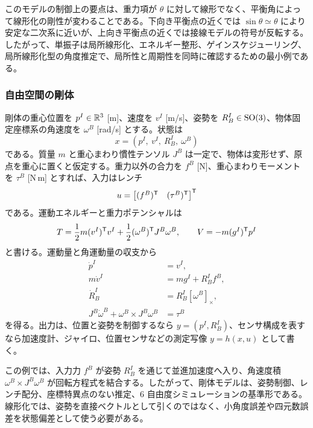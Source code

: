 このモデルの制御上の要点は、重力項が $\theta$ に対して線形でなく、平衡角によって線形化の剛性が変わることである。下向き平衡点の近くでは $\sin\theta\simeq\theta$ により安定な二次系に近いが、上向き平衡点の近くでは接線モデルの符号が反転する。したがって、単振子は局所線形化、エネルギー整形、ゲインスケジューリング、局所線形化型の角度推定で、局所性と周期性を同時に確認するための最小例である。

\subsubsection{自由空間の剛体}

剛体の重心位置を $p^I\in\mathbb{R}^3$ [m]、速度を $v^I$ [m/s]、姿勢を $R^I_B\in\operatorname{SO}(3)$、物体固定座標系の角速度を $\omega^B$ [rad/s] とする。状態は
\begin{equation}
  x=\left(p^I,\ v^I,\ R^I_B,\ \omega^B\right)
\end{equation}
である。質量 $m$ と重心まわり慣性テンソル $J^B$ は一定で、物体は変形せず、原点を重心に置くと仮定する。重力以外の合力を $f^B$ [N]、重心まわりモーメントを $\tau^B$ [N\,m] とすれば、入力はレンチ
\begin{equation}
  u=
  \begin{bmatrix}
    (f^B)^{\mathsf{T}}&(\tau^B)^{\mathsf{T}}
  \end{bmatrix}^{\mathsf{T}}
\end{equation}
である。運動エネルギーと重力ポテンシャルは
\begin{equation}
  T=\frac{1}{2}m(v^I)^{\mathsf{T}} v^I
    +\frac{1}{2}(\omega^B)^{\mathsf{T}} J^B\omega^B,
  \qquad
  V=-m(g^I)^{\mathsf{T}} p^I
\end{equation}
と書ける。運動量と角運動量の収支から
\begin{align}
  \dot{p}^I&=v^I,\\
  m\dot{v}^I&=mg^I+R^I_B f^B,\\
  \dot{R}^I_B&=R^I_B[\omega^B]_\times,\\
  J^B\dot{\omega}^B+\omega^B\times J^B\omega^B&=\tau^B
\end{align}
を得る。出力は、位置と姿勢を制御するなら $y=(p^I,R^I_B)$、センサ構成を表すなら加速度計、ジャイロ、位置センサなどの測定写像 $y=h(x,u)$ として書く。

この例では、入力力 $f^B$ が姿勢 $R^I_B$ を通じて並進加速度へ入り、角速度積 $\omega^B\times J^B\omega^B$ が回転方程式を結合する。したがって、剛体モデルは、姿勢制御、レンチ配分、座標特異点のない推定、6 自由度シミュレーションの基準形である。線形化では、姿勢を直接ベクトルとして引くのではなく、小角度誤差や四元数誤差を状態偏差として使う必要がある。

